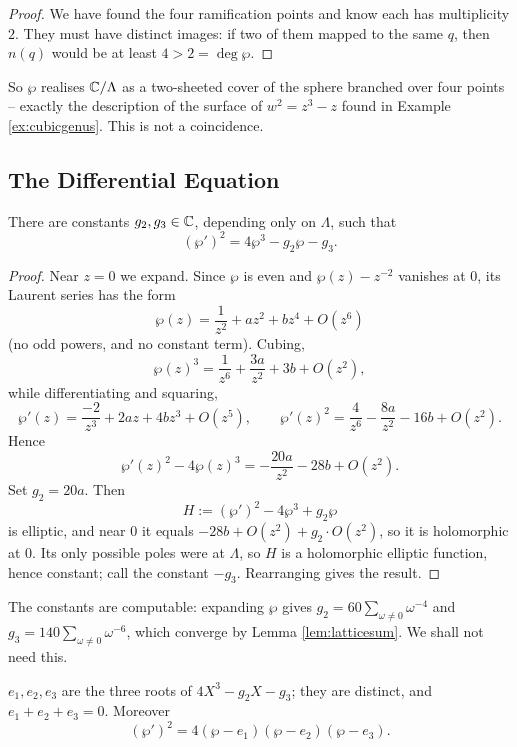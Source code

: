 \documentclass[a4paper]{scrartcl}
\begin{document}
\begin{proof}
	We have found the four ramification points and know each has multiplicity $2$. They
	must have distinct images: if two of them mapped to the same $q$, then $n(q)$ would be
	at least $4 > 2 = \deg\wp$.
\end{proof}

So $\wp$ realises $\mathbb{C}/\Lambda$ as a two-sheeted cover of the sphere branched over four
points -- exactly the description of the surface of $w^2 = z^3-z$ found in Example
\ref{ex:cubicgenus}. This is not a coincidence.

\subsection{The Differential Equation}

\begin{proposition}\label{prop:wpode}
	There are constants $g_2, g_3 \in \mathbb{C}$, depending only on $\Lambda$, such that
	$$
	(\wp')^2 = 4\wp^3 - g_2\wp - g_3.
	$$
\end{proposition}

\begin{proof}
	Near $z = 0$ we expand. Since $\wp$ is even and $\wp(z) - z^{-2}$ vanishes at $0$, its
	Laurent series has the form
	$$
	\wp(z) = \frac{1}{z^2} + az^2 + bz^4 + O(z^6)
	$$
	(no odd powers, and no constant term). Cubing,
	$$
	\wp(z)^3 = \frac{1}{z^6} + \frac{3a}{z^2} + 3b + O(z^2),
	$$
	while differentiating and squaring,
	$$
	\wp'(z) = \frac{-2}{z^3}+2az+4bz^3+O(z^5), \qquad
	\wp'(z)^2 = \frac{4}{z^6} - \frac{8a}{z^2} - 16 b + O(z^2).
	$$
	Hence
	$$
	\wp'(z)^2 - 4\wp(z)^3 = -\frac{20a}{z^2} - 28b + O(z^2).
	$$
	Set $g_2 = 20a$. Then
	$$
	H := (\wp')^2 - 4\wp^3 + g_2\wp
	$$
	is elliptic, and near $0$ it equals $-28b + O(z^2) + g_2 \cdot O(z^2)$, so it is
	holomorphic at $0$. Its only possible poles were at $\Lambda$, so $H$ is a holomorphic
	elliptic function, hence constant; call the constant $-g_3$. Rearranging gives the
	result.
\end{proof}

\begin{remark}
	The constants are computable: expanding $\wp$ gives
	$g_2 = 60\sum_{\omega\neq0}\omega^{-4}$ and $g_3 = 140\sum_{\omega\neq0}\omega^{-6}$,
	which converge by Lemma \ref{lem:latticesum}. We shall not need this.
\end{remark}

\begin{corollary}\label{cor:eiroots}
	$e_1, e_2, e_3$ are the three roots of $4X^3 - g_2X - g_3$; they are distinct, and
	$e_1+e_2+e_3 = 0$. Moreover
	$$
	(\wp')^2 = 4(\wp - e_1)(\wp-e_2)(\wp-e_3).
	$$
\end{corollary}
\end{document}
